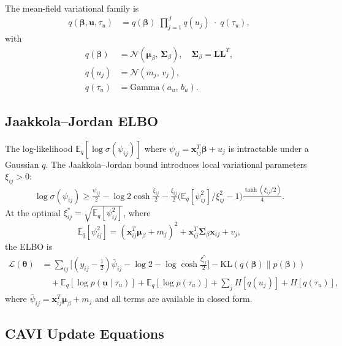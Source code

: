 \documentclass[11pt,a4paper]{article}
\newcommand{\E}{\mathbb{E}}
\newcommand{\N}{\mathcal{N}}
\newcommand{\sigmoid}{\sigma}
\begin{document}
The mean-field variational family is
\begin{align}
  q(\bm{\beta},\mathbf{u},\tau_u)
  &= q(\bm{\beta})\;\prod_{j=1}^{J} q(u_j)\;\cdot\; q(\tau_u),
\end{align}
with
\begin{align}
  q(\bm{\beta}) &= \N(\bm{\mu}_\beta,\,\bm{\Sigma}_\beta), \quad
    \bm{\Sigma}_\beta = \bm{L}\bm{L}^T,\\
  q(u_j) &= \mathcal{N}(m_j,\, v_j),\\
  q(\tau_u) &= \mathrm{Gamma}(a_u,\, b_u).
\end{align}

\subsection{Jaakkola--Jordan ELBO}

The log-likelihood $\E_q[\log\sigmoid(\psi_{ij})]$ where
$\psi_{ij} = \mathbf{x}_{ij}^T\bm{\beta} + u_j$ is intractable under a Gaussian $q$.
The Jaakkola--Jordan bound introduces local variational parameters $\xi_{ij}>0$:
\begin{equation}
  \log\sigmoid(\psi_{ij}) \geq \tfrac{\psi_{ij}}{2}
    - \log 2\cosh\!\tfrac{\xi_{ij}}{2}
    - \tfrac{\xi_{ij}}{2}\bigl(\E_q[\psi_{ij}^2]/\xi_{ij}^2 - 1\bigr)\tfrac{\tanh(\xi_{ij}/2)}{4}.
\end{equation}
At the optimal $\xi_{ij}^* = \sqrt{\E_q[\psi_{ij}^2]}$, where
\begin{equation}
  \E_q[\psi_{ij}^2]
  = (\mathbf{x}_{ij}^T\bm{\mu}_\beta + m_j)^2
    + \mathbf{x}_{ij}^T\bm{\Sigma}_\beta\mathbf{x}_{ij} + v_j,
\end{equation}
the ELBO is
\begin{align}
  \mathcal{L}(\bm{\theta})
  &= \sum_{ij}\!\bigl[(y_{ij}-\tfrac{1}{2})\bar{\psi}_{ij}
    - \log 2 - \log\cosh\tfrac{\xi_{ij}^*}{2}\bigr]
  - \mathrm{KL}(q(\bm{\beta})\|p(\bm{\beta}))\nonumber\\
  &\quad + \E_q[\log p(\mathbf{u}\mid\tau_u)]
    + \E_q[\log p(\tau_u)]
    + \sum_j H[q(u_j)] + H[q(\tau_u)],
\end{align}
where $\bar{\psi}_{ij} = \mathbf{x}_{ij}^T\bm{\mu}_\beta + m_j$ and
all terms are available in closed form.

\subsection{CAVI Update Equations}
\end{document}
